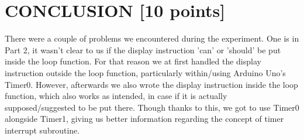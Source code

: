 \documentclass[pdftex,12pt,a4paper]{article}
\begin{document}
\section{CONCLUSION [10 points]}
There were a couple of problems we encountered during the experiment. One is in Part 2, it wasn't clear to us if the display instruction 'can' or 'should' be put inside the loop function. For that reason we at first handled the display instruction outside the loop function, particularly within/using Arduino Uno's Timer0. However, afterwards we also wrote the display instruction inside the loop function, which also works as intended, in case if it is actually supposed/suggested to be put there. Though thanks to this, we got to use Timer0 alongside Timer1, giving us better information regarding the concept of timer interrupt subroutine. 
\newpage
{}



\end{document}
